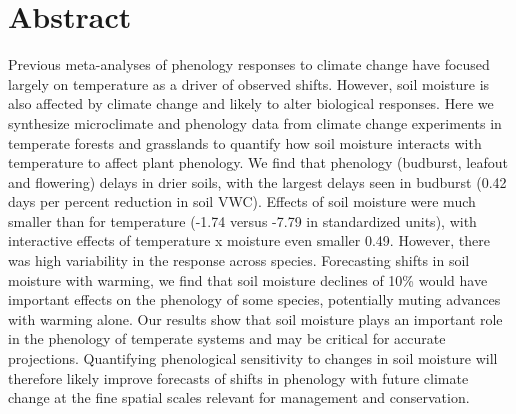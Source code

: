 \documentclass{article}
\begin{document}








\linenumbers

\section*{Abstract} %
Previous meta-analyses of phenology responses to climate change have focused largely on temperature as a driver of observed shifts. However, soil moisture is also affected by climate change and likely to alter biological responses. Here we synthesize microclimate and phenology data from climate change experiments in temperate forests and grasslands to quantify how soil moisture interacts with temperature to affect plant phenology. 
We find that phenology (budburst, leafout and flowering) delays in drier soils, with the largest delays seen in budburst (0.42 days per percent reduction in soil VWC). Effects of soil moisture were much smaller than for temperature (-1.74 versus -7.79 in standardized units), with interactive effects of temperature x moisture even smaller 0.49. However, there was high variability in the response across species. Forecasting shifts in soil moisture with warming, we find that soil moisture declines of 10\% would have important effects on the phenology of some species, potentially muting advances with warming alone. Our results show that soil moisture plays an important role in the phenology of temperate systems and may be critical for accurate projections. Quantifying phenological sensitivity to changes in soil moisture will therefore likely improve forecasts of shifts in phenology with future climate change at the fine spatial scales relevant for management and conservation.


\newpage
\end{document}
